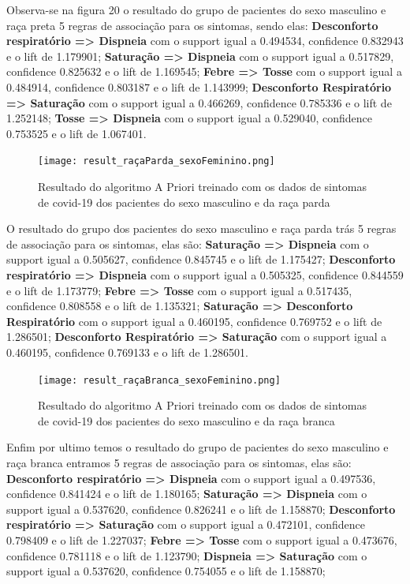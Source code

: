 \documentclass[tcc1]{uftex}
\begin{document}
\begin{itemize}
    Observa-se na figura 20 o resultado do grupo de pacientes do sexo masculino e raça preta 5 regras de associação para os sintomas, sendo elas: 
    \textbf{Desconforto respiratório => Dispneia} com o support igual a 0.494534, confidence 0.832943 e o lift de 1.179901;
    \textbf{Saturação => Dispneia} com o support igual a 0.517829, confidence 0.825632 e o lift de 1.169545; 
    \textbf{Febre => Tosse} com o support igual a 0.484914, confidence 0.803187 e o lift de 1.143999;
    \textbf{Desconforto Respiratório => Saturação} com o support igual a 0.466269, confidence 0.785336 e o lift de 1.252148;
    \textbf{Tosse => Dispneia} com o support igual a 0.529040, confidence 0.753525 e o lift de 1.067401.
    
    \begin{figure}[!h]
    \centering
    \texttt{[image: result\_raçaParda\_sexoFeminino.png]} %
    \caption{Resultado do algoritmo A Priori treinado com os dados de sintomas de covid-19 dos pacientes do sexo masculino e da raça parda}
    \end{figure}
    
    O resultado do grupo dos pacientes do sexo masculino e raça parda trás 5 regras de associação para os sintomas, elas são: 
    \textbf{Saturação => Dispneia} com o support igual a 0.505627, confidence 0.845745 e o lift de 1.175427;
    \textbf{Desconforto respiratório => Dispneia} com o support igual a 0.505325, confidence 0.844559 e o lift de 1.173779; 
    \textbf{Febre => Tosse} com o support igual a 0.517435, confidence 0.808558 e o lift de 1.135321;
    \textbf{Saturação => Desconforto Respiratório} com o support igual a 0.460195, confidence 0.769752 e o lift de 1.286501;
    \textbf{Desconforto Respiratório => Saturação} com o support igual a 0.460195, confidence 0.769133 e o lift de 1.286501.
    
    \begin{figure}[!h]
    \centering
    \texttt{[image: result\_raçaBranca\_sexoFeminino.png]} %
    \caption{Resultado do algoritmo A Priori treinado com os dados de sintomas de covid-19 dos pacientes do sexo masculino e da raça branca}
    \end{figure}
    
    Enfim por ultimo temos o resultado do grupo de pacientes do sexo masculino e raça branca entramos 5 regras de associação para os sintomas, elas são:
    \textbf{Desconforto respiratório => Dispneia} com o support igual a 0.497536, confidence 0.841424 e o lift de 1.180165;
    \textbf{Saturação => Dispneia} com o support igual a 0.537620, confidence 0.826241 e o lift de 1.158870; 
    \textbf{Desconforto respiratório => Saturação} com o support igual a 0.472101, confidence 0.798409 e o lift de 1.227037;
    \textbf{Febre => Tosse} com o support igual a 0.473676, confidence 0.781118 e o lift de 1.123790;
    \textbf{Dispneia => Saturação} com o support igual a 0.537620, confidence 0.754055 e o lift de 1.158870;
    

\end{itemize}
\end{document}
